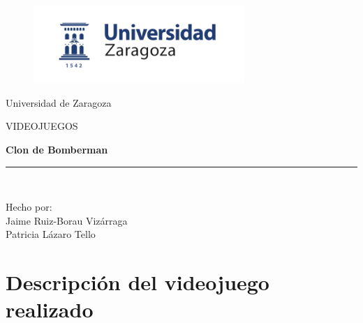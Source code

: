 \documentclass[a4paper]{article}
\begin{document}
\begin{titlepage}

\begin{center}
\vspace*{1.5in}
\vspace*{-1in}
\begin{figure}[htb]
\begin{center}
\includegraphics[width=8cm]{logoUZ.png}
\end{center}
\end{figure}

\vspace*{0.3in}

Universidad de Zaragoza \\

\vspace*{0.3in}

\begin{large}
VIDEOJUEGOS\\
\end{large}
\vspace*{0.2in}
\begin{Large}
\textbf{Clon de Bomberman} \\
\end{Large}
\vspace*{0.3in}
\begin{large}
\end{large}
\vspace*{0.1in}
\rule{80mm}{0.1mm}\\
\vspace*{0.1in}
\begin{large}
Hecho por: \\
Jaime Ruiz-Borau Vizárraga \\
Patricia Lázaro Tello \\

\end{large}
\end{center}

\end{titlepage}
\tableofcontents

\newpage
\section{Descripción del videojuego realizado}
\end{document}
